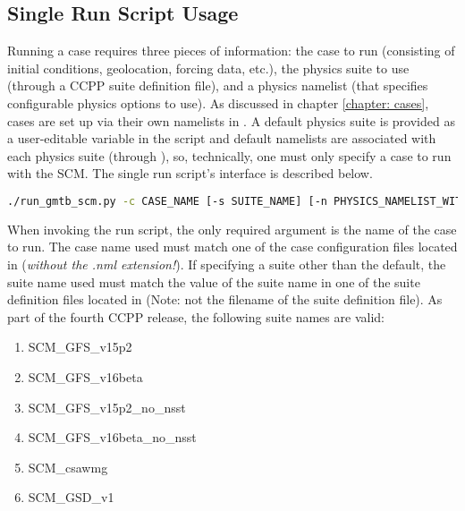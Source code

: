 \subsection{Single Run Script Usage} \label{subsection: singlerunscript}
Running a case requires three pieces of information: the case to run (consisting of initial conditions, geolocation, forcing data, etc.), the physics suite to use (through a CCPP suite definition file), and a physics namelist (that specifies configurable physics options to use). As discussed in chapter \ref{chapter: cases}, cases are set up via their own namelists in . A default physics suite is provided as a user-editable variable in the script and default namelists are associated with each physics suite (through ), so, technically, one must only specify a case to run with the SCM. The single run script's interface is described below.

\begin{lstlisting}[language=bash]
./run_gmtb_scm.py -c CASE_NAME [-s SUITE_NAME] [-n PHYSICS_NAMELIST_WITH_PATH] [-g] [-d]
\end{lstlisting}

When invoking the run script, the only required argument is the name of the case to run. The case name used must match one of the case configuration files located in  (\emph{without the .nml extension!}). If specifying a suite other than the default, the suite name used must match the value of the suite name in one of the suite definition files located in  (Note: not the filename of the suite definition file). As part of the fourth CCPP release, the following suite names are valid:
\begin{enumerate}
\item SCM\_GFS\_v15p2
\item SCM\_GFS\_v16beta
\item SCM\_GFS\_v15p2\_no\_nsst
\item SCM\_GFS\_v16beta\_no\_nsst
\item SCM\_csawmg
\item SCM\_GSD\_v1
\end{enumerate}

